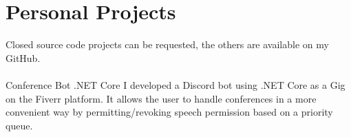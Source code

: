 \section*{Personal Projects}
\footnotesize
Closed source code projects can be requested, the others are available on my GitHub.\\\\
\normalsize
\tech
  {Conference Bot}
  {.NET Core}
  {I developed a Discord bot using .NET Core as a Gig on the Fiverr platform.
   It allows the user to handle conferences in a more convenient way by permitting/revoking speech permission based on a priority queue.}